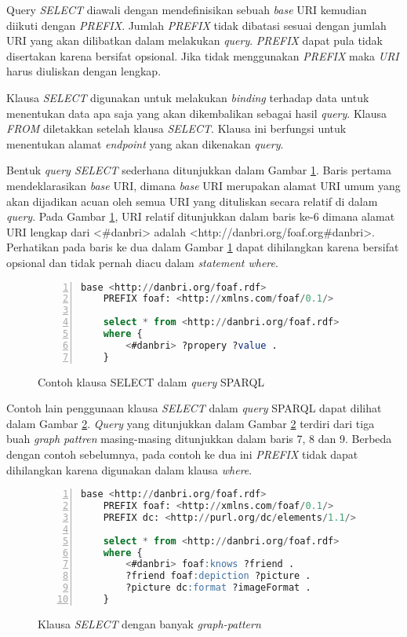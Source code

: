 Query \emph{SELECT} diawali dengan mendefinisikan sebuah \emph{base} URI kemudian diikuti dengan \emph{PREFIX}. Jumlah \emph{PREFIX} tidak dibatasi sesuai dengan jumlah URI yang akan dilibatkan dalam melakukan \emph{query}. \emph{PREFIX} dapat pula tidak disertakan karena bersifat opsional. Jika tidak menggunakan \emph{PREFIX} maka \emph{URI} harus diuliskan dengan lengkap.

Klausa \emph{SELECT} digunakan untuk melakukan \emph{binding} terhadap data untuk menentukan data apa saja yang akan dikembalikan sebagai hasil \emph{query}. Klausa \emph{FROM} diletakkan setelah klausa \emph{SELECT}. Klausa ini berfungsi untuk menentukan alamat \emph{endpoint} yang akan dikenakan \emph{query}.

Bentuk \emph{query SELECT} sederhana ditunjukkan dalam Gambar \ref{fig:sparql_select_1}. Baris pertama mendeklarasikan \emph{base} URI, dimana \emph{base} URI merupakan alamat URI umum yang akan dijadikan acuan oleh semua URI yang dituliskan secara relatif di dalam \emph{query}. Pada Gambar \ref{fig:sparql_select_1}, URI relatif ditunjukkan dalam baris ke-6 dimana alamat URI lengkap dari <\#danbri> adalah <http://danbri.org/foaf.org\#danbri>. Perhatikan pada baris ke dua dalam Gambar \ref{fig:sparql_select_1} dapat dihilangkan karena bersifat opsional dan tidak pernah diacu dalam \emph{statement where}.

\begin{figure}[hb]
	\centering
	\begin{lstlisting}[language=SQL, numbers=left]
	base <http://danbri.org/foaf.rdf>
	PREFIX foaf: <http://xmlns.com/foaf/0.1/>

	select * from <http://danbri.org/foaf.rdf>
	where {
		<#danbri> ?propery ?value .
	}\end{lstlisting}
	\caption{Contoh klausa SELECT dalam \emph{query} SPARQL \citep{liyang_yu}}
	\label{fig:sparql_select_1}
\end{figure}

Contoh lain penggunaan klausa \emph{SELECT} dalam \emph{query} SPARQL dapat dilihat dalam Gambar \ref{fig:sparql_select_2}. \emph{Query} yang ditunjukkan dalam Gambar \ref{fig:sparql_select_2} terdiri dari tiga buah \emph{graph pattren} masing-masing ditunjukkan dalam baris 7, 8 dan 9. Berbeda dengan contoh sebelumnya, pada contoh ke dua ini \emph{PREFIX} tidak dapat dihilangkan karena digunakan dalam klausa \emph{where}. 

\begin{figure}[ht]
	\centering
	\begin{lstlisting}[language=SQL,numbers=left]
	base <http://danbri.org/foaf.rdf>
	PREFIX foaf: <http://xmlns.com/foaf/0.1/>
	PREFIX dc: <http://purl.org/dc/elements/1.1/>

	select * from <http://danbri.org/foaf.rdf>
	where {
		<#danbri> foaf:knows ?friend .
		?friend foaf:depiction ?picture .
		?picture dc:format ?imageFormat .
	}\end{lstlisting}
	\caption{Klausa \emph{SELECT} dengan banyak \emph{graph-pattern} \citep{liyang_yu}}
	\label{fig:sparql_select_2}
\end{figure}

